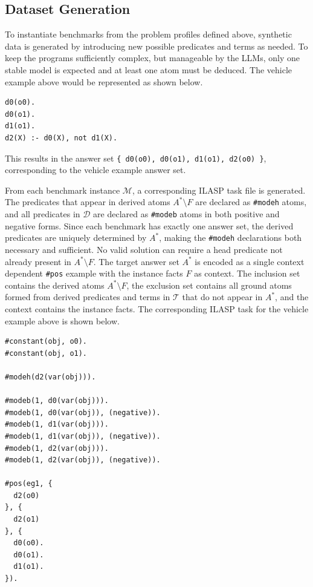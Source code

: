 \documentclass[11pt,a4paper]{article}
\begin{document}
\subsection{Dataset Generation}\label{sec:datagen}

To instantiate benchmarks from the problem profiles defined above, synthetic data is generated by introducing new possible predicates and terms as needed. To keep the programs sufficiently complex, but manageable by the LLMs, only one stable model is expected and at least one atom must be deduced. The vehicle example above would be represented as shown below.

\begin{lstlisting}[language=ASP, caption={Benchmark ASP program.}]
d0(o0).
d0(o1).
d1(o1).
d2(X) :- d0(X), not d1(X).
\end{lstlisting}

This results in the answer set \texttt{\{\ d0(o0), d0(o1), d1(o1), d2(o0) \}}, corresponding to the vehicle example answer set.

From each benchmark instance $\mathcal{M}$, a corresponding ILASP task file is generated. The predicates that appear in derived atoms $A^{*} \setminus F$ are declared as \texttt{\#modeh} atoms, and all predicates in $\mathcal{D}$ are declared as \texttt{\#modeb} atoms in both positive and negative forms. Since each benchmark has exactly one answer set, the derived predicates are uniquely determined by $A^{*}$, making the \texttt{\#modeh} declarations both necessary and sufficient. No valid solution can require a head predicate not already present in $A^{*} \setminus F$. The target answer set $A^{*}$ is encoded as a single context dependent \texttt{\#pos} example with the instance facts $F$ as context. The inclusion set contains the derived atoms $A^{*} \setminus F$, the exclusion set contains all ground atoms formed from derived predicates and terms in $\mathcal{T}$ that do not appear in $A^{*}$, and the context contains the instance facts. The corresponding ILASP task for the vehicle example above is shown below.

\begin{lstlisting}[language=ASP, caption={Corresponding ILASP task.}]
#constant(obj, o0).
#constant(obj, o1).

#modeh(d2(var(obj))).

#modeb(1, d0(var(obj))).
#modeb(1, d0(var(obj)), (negative)).
#modeb(1, d1(var(obj))).
#modeb(1, d1(var(obj)), (negative)).
#modeb(1, d2(var(obj))).
#modeb(1, d2(var(obj)), (negative)).

#pos(eg1, {
  d2(o0)
}, {
  d2(o1)
}, {
  d0(o0).
  d0(o1).
  d1(o1).
}).
\end{lstlisting}
\end{document}
